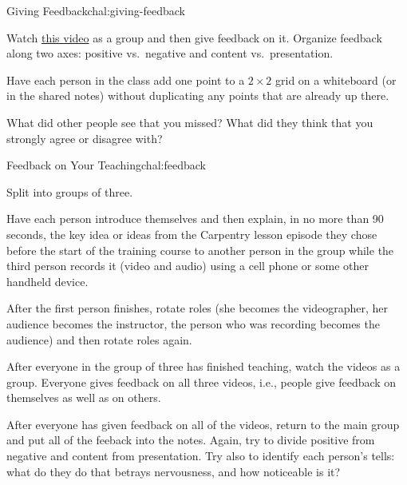 \begin{challenge}{Giving Feedback}{chal:giving-feedback}

\begin{genumerate}

\item
  Watch \href{https://www.youtube.com/watch?v=-ApVt04rB4U}{this video}
  as a group and then give feedback on it. Organize feedback along two
  axes: positive vs.\ negative and content vs.\ presentation.

\item
  Have each person in the class add one point to a $2{\times}2$ grid
  on a whiteboard (or in the shared notes) without duplicating any
  points that are already up there.

\end{genumerate}

\noindent
What did other people see that you missed?  What did they think that
you strongly agree or disagree with?

\end{challenge}

\begin{challenge}{Feedback on Your Teaching}{chal:feedback}

\begin{genumerate}

\item
  Split into groups of three.

\item
  Have each person introduce themselves and then explain, in no more
  than 90 seconds, the key idea or ideas from the Carpentry lesson
  episode they chose before the start of the training course to another
  person in the group while the third person records it (video and
  audio) using a cell phone or some other handheld device.

\item
  After the first person finishes, rotate roles (she becomes the
  videographer, her audience becomes the instructor, the person who was
  recording becomes the audience) and then rotate roles again.

\item
  After everyone in the group of three has finished teaching, watch the
  videos as a group. Everyone gives feedback on all three videos, i.e.,
  people give feedback on themselves as well as on others.

\item
  After everyone has given feedback on all of the videos, return to the
  main group and put all of the feeback into the notes.  Again, try to
  divide positive from negative and content from presentation.  Try
  also to identify each person's tells: what do they do that betrays
  nervousness, and how noticeable is it?

\end{genumerate}

\end{challenge}
